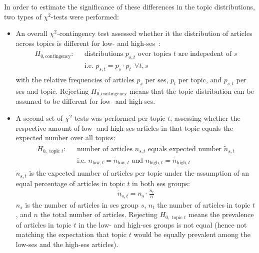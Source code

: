 In order to estimate the significance of these differences in the topic distributions, two types of $\chi^2$-tests were performed:
\begin{itemize}
    \item An overall $\chi^2$-contingency test assessed whether it the distribution of articles across topics is different for low- and high-\gls{ses}~\autocite[p. 430]{fahrmeir_spezielle_2016}:
    \begin{align}
        \begin{split}\label{eq:h0_contingency}
            H_{0, \text{contingency}}: ~~~ &\text{distributions } p_{s, t} \text{ over topics } t \text{ are indepedent of } s\\
        & \text{i.e. } p_{s, t} = p_s \cdot p_t ~~ \forall t, s
        \end{split}
    \end{align}
    with the relative frequencies of articles $p_s$ per \gls{ses}, $p_t$ per topic, and $p_{s, t}$ per \gls{ses} and topic. Rejecting $H_{0, \text{contingency}}$ means that the topic distribution can be assumed to be different for low- and high-\gls{ses}.

    \item A second set of $\chi^2$ tests was performed per topic $t$, assessing whether the respective amount of low- and high-\gls{ses} articles in that topic equals the expected number over all topics:
    \begin{align}
        \begin{split}\label{eq:h0_topic}
            H_{0, \text{ topic }t}: ~~~ &\text{number of articles } n_{s, t} \text{ equals expected number } \tilde n_{s, t} \\
            & \text{i.e. } n_{\text{low}, t} = \tilde n_{\text{low}, t} \text{ and } n_{\text{high}, t} = \tilde n_{\text{high}, t}
        \end{split}
    \end{align}
    $\tilde n_{s, t}$ is the expected number of articles per topic under the assumption of an equal percentage of articles in topic $t$ in both \gls{ses} groups:
    \begin{align}
        \tilde n_{s, t} = n_s \cdot \frac{n_t}{n}
    \end{align}
    $n_s$ is the number of articles in \gls{ses} group $s$, $n_t$ the number of articles in topic $t$, and $n$ the total number of articles. Rejecting $H_{0, \text{ topic }t}$ means the prevalence of articles in topic $t$ in the low- and high-\gls{ses} groups is not equal (hence not matching the expectation that topic $t$ would be equally prevalent among the low-\gls{ses} and the high-\gls{ses} articles).
\end{itemize}

